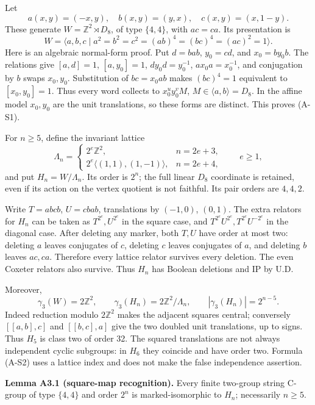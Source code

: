 \documentclass[
  11pt,
  a4paper,
]{article}
\begin{document}
Let \[
 a(x,y)=(-x,y),\quad b(x,y)=(y,x),\quad c(x,y)=(x,1-y).
\] These generate \(W=\mathbb Z^2\rtimes D_8\), of type \(\{4,4\}\),
with \(ac=ca\). Its presentation is \[
 W=\langle a,b,c\mid a^2=b^2=c^2=(ab)^4=(bc)^4=(ac)^2=1\rangle. \tag{A-S1}
\] Here is an algebraic normal-form proof. Put \(d=bab\), \(y_0=cd\),
and \(x_0=by_0b\). The relations give \([a,d]=1\), \([a,y_0]=1\),
\(dy_0d=y_0^{-1}\), \(ax_0a=x_0^{-1}\), and conjugation by \(b\) swaps
\(x_0,y_0\). Substitution of \(bc=x_0ab\) makes \((bc)^4=1\) equivalent
to \([x_0,y_0]=1\). Thus every word collects to \(x_0^u y_0^v M\),
\(M\in\langle a,b\rangle=D_8\). In the affine model \(x_0,y_0\) are the
unit translations, so these forms are distinct. This proves (A-S1).

For \(n\ge5\), define the invariant lattice \[
 \Lambda_n=\begin{cases}
  2^e\mathbb Z^2,&n=2e+3,\\
  2^e\langle(1,1),(1,-1)\rangle,&n=2e+4,
 \end{cases}\qquad e\ge1,
\] and put \(H_n=W/\Lambda_n\). Its order is \(2^n\); the full linear
\(D_8\) coordinate is retained, even if its action on the vertex
quotient is not faithful. Its pair orders are \(4,4,2\).

Write \(T=abcb\), \(U=cbab\), translations by \((-1,0)\), \((0,1)\). The
extra relators for \(H_n\) can be taken as \(T^{2^e},U^{2^e}\) in the
square case, and \(T^{2^e}U^{2^e},T^{2^e}U^{-2^e}\) in the diagonal
case. After deleting any marker, both \(T,U\) have order at most two:
deleting \(a\) leaves conjugates of \(c\), deleting \(c\) leaves
conjugates of \(a\), and deleting \(b\) leaves \(ac,ca\). Therefore
every lattice relator survives every deletion. The even Coxeter relators
also survive. Thus \(H_n\) has Boolean deletions and IP by U.D.

Moreover, \[
 \gamma_3(W)=2\mathbb Z^2,
 \qquad \gamma_3(H_n)=2\mathbb Z^2/\Lambda_n,
 \qquad |\gamma_3(H_n)|=2^{n-5}.                         \tag{A-S2}
\] Indeed reduction modulo \(2\mathbb Z^2\) makes the adjacent squares
central; conversely \([[a,b],c]\) and \([[b,c],a]\) give the two doubled
unit translations, up to signs. Thus \(H_5\) is class two of order 32.
The squared translations are not always independent cyclic subgroups: in
\(H_6\) they coincide and have order two. Formula (A-S2) uses a lattice
index and does not make the false independence assertion.

\textbf{Lemma A3.1 (square-map recognition).} Every finite two-group
string C-group of type \(\{4,4\}\) and order \(2^n\) is
marked-isomorphic to \(H_n\); necessarily \(n\ge5\).
\end{document}

